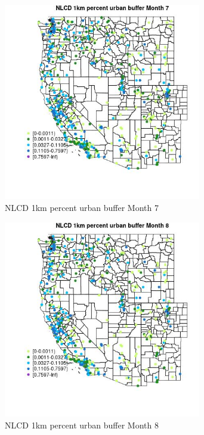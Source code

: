 \begin{figure} 
\centering  
\includegraphics[width=0.77\textwidth]{Code_Outputs/Report_ML_input_PM25_Step4_part_e_de_duplicated_aves_compiled_2019-05-14wNAs_MapObsMo7NLCD_1km_percent_urban_buffer.jpg} 
\caption{\label{fig:Report_ML_input_PM25_Step4_part_e_de_duplicated_aves_compiled_2019-05-14wNAsMapObsMo7NLCD_1km_percent_urban_buffer}NLCD 1km percent urban buffer Month 7} 
\end{figure} 
 

\begin{figure} 
\centering  
\includegraphics[width=0.77\textwidth]{Code_Outputs/Report_ML_input_PM25_Step4_part_e_de_duplicated_aves_compiled_2019-05-14wNAs_MapObsMo8NLCD_1km_percent_urban_buffer.jpg} 
\caption{\label{fig:Report_ML_input_PM25_Step4_part_e_de_duplicated_aves_compiled_2019-05-14wNAsMapObsMo8NLCD_1km_percent_urban_buffer}NLCD 1km percent urban buffer Month 8} 
\end{figure} 
 

